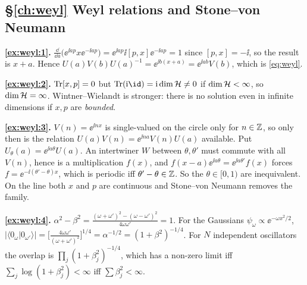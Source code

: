 {\subsection*{\S\ref{ch:weyl} Weyl relations and Stone--von Neumann}
\textbf{\ref{ex:weyl:1}.} $\frac{\dd}{\dd a}\big(\ee^{\ii ap}x\ee^{-\ii ap}\big)=\ee^{\ii ap}\ii[p,x]\ee^{-\ii ap}=1$ since $[p,x]=-\ii$, so the result is $x+a$. Hence $U(a)V(b)U(a)^{-1}=\ee^{\ii b(x+a)}=\ee^{\ii ab}V(b)$, which is \eqref{eq:weyl}.\par
\textbf{\ref{ex:weyl:2}.} $\operatorname{Tr}[x,p]=0$ but $\Tr(\ii\id)=\ii\dim\HH\ne0$ if $\dim\mathcal{H}<\infty$, so $\dim\mathcal{H}=\infty$. Wintner--Wielandt is stronger: there is no solution even in infinite dimensions if $x,p$ are \emph{bounded}.\par
\textbf{\ref{ex:weyl:3}.} $V(n)=\ee^{\ii nx}$ is single-valued on the circle only for $n\in\mathbb{Z}$, so only then is the relation $U(a)V(n)=\ee^{\ii na}V(n)U(a)$ available. Put $U_\theta(a)=\ee^{\ii a\theta}U(a)$. An intertwiner $W$ between $\theta,\theta'$ must commute with all $V(n)$, hence is a multiplication $f(x)$, and $f(x-a)\ee^{\ii a\theta}=\ee^{\ii a\theta'}f(x)$ forces $f=\ee^{-\ii(\theta'-\theta)x}$, which is periodic iff $\theta'-\theta\in\mathbb{Z}$. So the $\theta\in[0,1)$ are inequivalent. On the line both $x$ and $p$ are continuous and Stone--von Neumann removes the family.\par
\textbf{\ref{ex:weyl:4}.} $\alpha^2-\beta^2=\frac{(\omega+\omega')^2-(\omega-\omega')^2}{4\omega\omega'}=1$. For the Gaussians $\psi_\omega\propto\ee^{-\omega x^2/2}$, $|\langle0_\omega|0_{\omega'}\rangle|=\big[\frac{4\omega\omega'}{(\omega+\omega')^2}\big]^{1/4}=\alpha^{-1/2}=(1+\beta^2)^{-1/4}$. For $N$ independent oscillators the overlap is $\prod_j(1+\beta_j^2)^{-1/4}$, which has a non-zero limit iff $\sum_j\log(1+\beta_j^2)<\infty$ iff $\sum\beta_j^2<\infty$.\par

}
